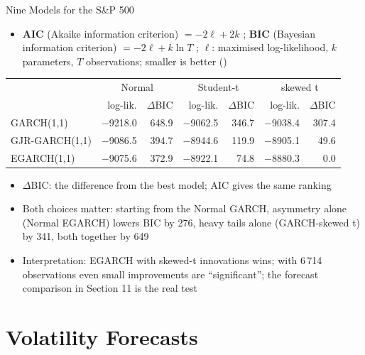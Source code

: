 \begin{frame}{Nine Models for the S\&P 500}
\itemsize{\footnotesize}
\begin{itemize}
    \item \textbf{AIC} (Akaike information criterion) $= -2\ell + 2k$ ; \textbf{BIC} (Bayesian information criterion) $= -2\ell + k\ln T$ ; $\ell$: maximised log-likelihood, $k$ parameters, $T$ observations; smaller is better ()
\end{itemize}\begin{center}
\scriptsize
\begin{tabular}{lrrrrrr}
\toprule
& \multicolumn{2}{c}{Normal} & \multicolumn{2}{c}{Student-t} & \multicolumn{2}{c}{skewed t} \\ & log-lik. & $\Delta$BIC & log-lik. & $\Delta$BIC & log-lik. & $\Delta$BIC \\
\midrule
GARCH(1,1) & \ensuremath{-}9218.0 & 648.9 & \ensuremath{-}9062.5 & 346.7 & \ensuremath{-}9038.4 & 307.4 \\
GJR-GARCH(1,1) & \ensuremath{-}9086.5 & 394.7 & \ensuremath{-}8944.6 & 119.9 & \ensuremath{-}8905.1 & 49.6 \\
EGARCH(1,1) & \ensuremath{-}9075.6 & 372.9 & \ensuremath{-}8922.1 & 74.8 & \ensuremath{-}8880.3 & 0.0 \\
\bottomrule
\end{tabular}
\end{center}
\begin{itemize}
    \item $\Delta$BIC: the difference from the best model; AIC gives the same ranking
    \item Both choices matter: starting from the Normal GARCH, asymmetry alone (Normal EGARCH) lowers BIC by 276, heavy tails alone (GARCH-skewed t) by 341, both together by 649
    \item Interpretation: EGARCH with skewed-t innovations wins; with 6\,714 observations even small improvements are ``significant''; the forecast comparison in Section 11 is the real test
\end{itemize}
\end{frame}


\section{Volatility Forecasts}

